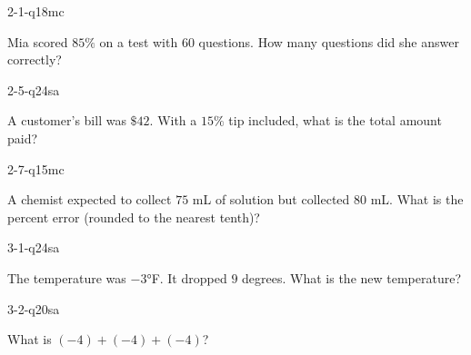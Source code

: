 \begin{practiceQuestion}{2-1-q18}{mc}
\begin{questionText}
Mia scored $85\%$ on a test with $60$ questions. How many questions did she answer correctly?
\end{questionText}
\end{practiceQuestion}

\begin{practiceQuestion}{2-5-q24}{sa}
\begin{questionText}
A customer's bill was $\$42$. With a $15\%$ tip included, what is the total amount paid?
\end{questionText}
\end{practiceQuestion}

\begin{practiceQuestion}{2-7-q15}{mc}
\begin{questionText}
A chemist expected to collect $75$ mL of solution but collected $80$ mL. What is the percent error (rounded to the nearest tenth)?
\end{questionText}
\end{practiceQuestion}

\begin{practiceQuestion}{3-1-q24}{sa}
\begin{questionText}
The temperature was $-3°$F. It dropped $9$ degrees. What is the new temperature?
\end{questionText}
\end{practiceQuestion}

\begin{practiceQuestion}{3-2-q20}{sa}
\begin{questionText}
What is $(-4) + (-4) + (-4)$?
\end{questionText}
\end{practiceQuestion}

